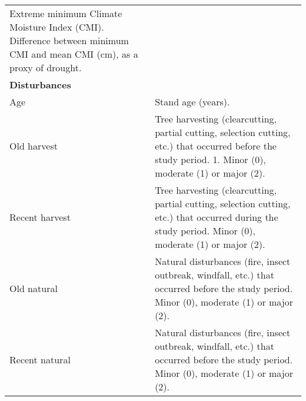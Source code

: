\documentclass[
  a4paperpaper,
]{article}
\begin{document}
\begin{longtable}[]{@{}ll@{}}
\begin{minipage}[t]{0.72\columnwidth}
Extreme minimum Climate Moisture Index (CMI). Difference between minimum
CMI and mean CMI (cm), as a proxy of drought.\strut
\end{minipage}\tabularnewline
\begin{minipage}[t]{0.22\columnwidth}\raggedright
\textbf{Disturbances}\strut
\end{minipage} & \begin{minipage}[t]{0.72\columnwidth}\raggedright
\strut
\end{minipage}\tabularnewline
\begin{minipage}[t]{0.22\columnwidth}\raggedright
Age\strut
\end{minipage} & \begin{minipage}[t]{0.72\columnwidth}\raggedright
Stand age (years).\strut
\end{minipage}\tabularnewline
\begin{minipage}[t]{0.22\columnwidth}\raggedright
Old harvest\strut
\end{minipage} & \begin{minipage}[t]{0.72\columnwidth}\raggedright
Tree harvesting (clearcutting, partial cutting, selection cutting, etc.)
that occurred before the study period. 1. Minor (0), moderate (1) or
major (2).\strut
\end{minipage}\tabularnewline
\begin{minipage}[t]{0.22\columnwidth}\raggedright
Recent harvest\strut
\end{minipage} & \begin{minipage}[t]{0.72\columnwidth}\raggedright
Tree harvesting (clearcutting, partial cutting, selection cutting, etc.)
that occurred during the study period. Minor (0), moderate (1) or major
(2).\strut
\end{minipage}\tabularnewline
\begin{minipage}[t]{0.22\columnwidth}\raggedright
Old natural\strut
\end{minipage} & \begin{minipage}[t]{0.72\columnwidth}\raggedright
Natural disturbances (fire, insect outbreak, windfall, etc.) that
occurred before the study period. Minor (0), moderate (1) or major
(2).\strut
\end{minipage}\tabularnewline
\begin{minipage}[t]{0.22\columnwidth}\raggedright
Recent natural\strut
\end{minipage} & \begin{minipage}[t]{0.72\columnwidth}\raggedright
Natural disturbances (fire, insect outbreak, windfall, etc.) that
occurred before the study period. Minor (0), moderate (1) or major
(2).\strut
\end{minipage}\tabularnewline
\bottomrule
\end{longtable}
\end{document}
